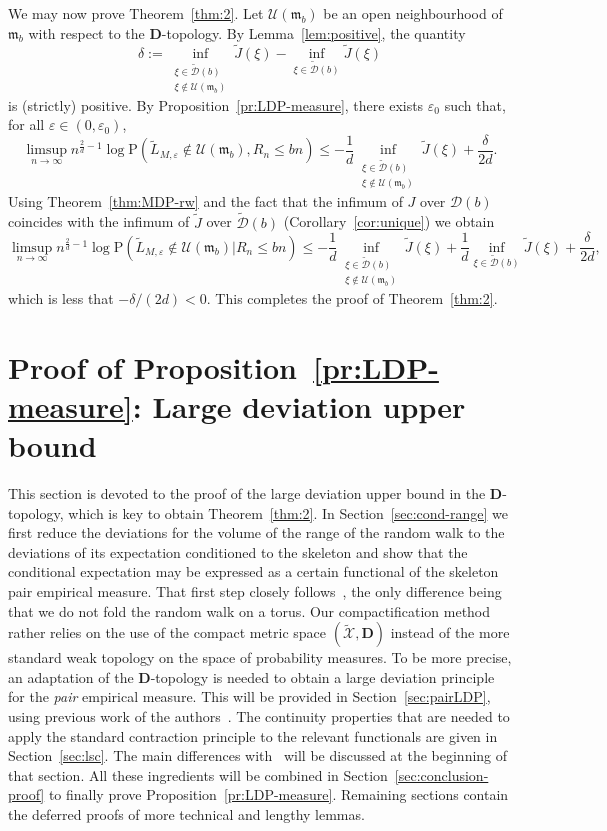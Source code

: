 \documentclass[a4paper,11pt]{amsart}
\numberwithin{equation}{section}
\newcommand{\cD}{{\ensuremath{\mathcal D}} }
\newcommand{\cU}{{\ensuremath{\mathcal U}} }
\newcommand{\cX}{{\ensuremath{\mathcal X}} }
\newcommand{\gd}{\delta}
\newcommand{\gep}{\varepsilon}
\newcommand{\bfD}{\mathbf{D}}
\renewcommand{\tilde}{\widetilde}          %
\newcommand{\inftwo}[2]{\inf_{\substack{#1 \\ #2}}} %
\newcommand\bP{\ensuremath{\mathrm{P}}}
\newcommand{\8}{\infty}
\newcommand{\beq}{\begin{equation}}
\newcommand{\eeq}{\end{equation}}
\newcommand{\fm}{\mathfrak{m}}
\begin{document}
%
We may now prove Theorem~\ref{thm:2}. Let $\cU(\fm_b)$ be an open neighbourhood of $\fm_b$ with respect to the $\bfD$-topology. By Lemma~\ref{lem:positive}, the quantity
\beq
\gd := \inftwo{\xi \in \tilde \cD(b)}{\xi \notin \cU(\fm_b)} \tilde J(\xi)
-\inf_{\xi \in \tilde\cD(b)} \tilde J(\xi)
\eeq
is (strictly) positive. By Proposition~\ref{pr:LDP-measure}, there exists $\gep_0$ such that, for all $\gep \in (0,\gep_0)$,
\beq
\limsup_{n\to\infty} n^{\frac2d -1}
\log \bP(\tilde L_{M,\gep} \notin \cU(\fm_b), R_n\le bn) \le 
- { \frac 1d}\inftwo{\xi \in \tilde \cD(b)}{\xi \notin \cU(\fm_b)} \tilde J(\xi) + \frac{\gd}{2{ d}}.
\eeq
 Using Theorem~\ref{thm:MDP-rw} and the fact that the infimum of $J$ over $\cD(b)$ coincides with the infimum of $\tilde J$ over $\tilde \cD(b)$ (Corollary~\ref{cor:unique}) we obtain
\beq
\limsup_{n\to\infty} n^{\frac2d -1}
\log \bP(\tilde L_{M,\gep}\notin \cU(\fm_b) | R_n\le bn) \le - { \frac 1d}\inftwo{\xi \in \tilde \cD(b)}{\xi \notin \cU(\fm_b)} \tilde J(\xi) + { \frac 1d}\inf_{\xi \in\tilde\cD(b)}\tilde J(\xi) + \frac{\delta}{2{ d}},
\eeq
which is less that ${ -\gd/(2d)}<0$.
This completes the proof of Theorem~\ref{thm:2}.

\section{Proof of Proposition~\ref{pr:LDP-measure}: Large deviation upper bound}
\label{sec:ldp}
This section is devoted to the proof of the large deviation upper bound in the $\bfD$-topology, which is key to obtain Theorem~\ref{thm:2}. In Section~\ref{sec:cond-range} we first reduce the deviations for the volume of the range of the random walk to the deviations of its expectation conditioned to the skeleton and show that the conditional expectation may be expressed as a certain functional of the skeleton pair empirical measure. That first step closely follows~\cite{Phetpradap, BBH2001}, the only difference being that we do not fold the random walk on a torus. Our compactification method rather relies on the use of the compact metric space $(\tilde \cX, \bfD)$ instead of the more standard weak topology on the space of probability measures. To be more precise, an adaptation of the $\bfD$-topology is needed to obtain a large deviation principle for the {\it pair} empirical measure. This will be provided in Section~\ref{sec:pairLDP}, using previous work of the authors~\cite{EP23}. The continuity properties that are needed to apply the standard contraction principle to the relevant functionals are given in Section~\ref{sec:lsc}. The main differences with~\cite{Phetpradap, BBH2001} will be discussed at the beginning of that section. All these ingredients will be combined in Section~\ref{sec:conclusion-proof} to finally prove Proposition~\ref{pr:LDP-measure}. Remaining sections contain the deferred proofs of more technical and lengthy lemmas.
%
\end{document}
